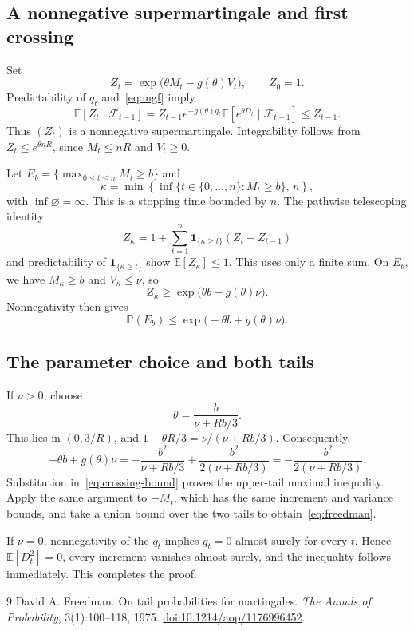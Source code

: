 \documentclass[11pt,a4paper]{article}
\numberwithin{equation}{section}
\theoremstyle{remark}
\newcommand{\E}{\mathbb E}
\newcommand{\Pp}{\mathbb P}
\newcommand{\F}{\mathcal F}
\newcommand{\ind}{\mathbf 1}
\begin{document}
\subsection{A nonnegative supermartingale and first crossing}

Set
\[
 Z_t=\exp\!\bigl(\theta M_t-g(\theta)V_t\bigr),\qquad Z_0=1.
\]
Predictability of $q_t$ and~\eqref{eq:mgf} imply
\[
 \E[Z_t\mid\F_{t-1}]
 =Z_{t-1}e^{-g(\theta)q_t}
       \E[e^{\theta D_t}\mid\F_{t-1}]
 \le Z_{t-1}.
\]
Thus $(Z_t)$ is a nonnegative supermartingale. Integrability follows
from $Z_t\le e^{\theta nR}$, since $M_t\le nR$ and $V_t\ge0$.

Let $E_b=\{\max_{0\le t\le n}M_t\ge b\}$ and
\[
 \kappa=\min\!\left\{\inf\{t\in\{0,\ldots,n\}:M_t\ge b\},\,n\right\},
\]
with $\inf\varnothing=\infty$. This is a stopping time bounded by $n$.
The pathwise telescoping identity
\[
 Z_\kappa=1+\sum_{t=1}^n
       \ind_{\{\kappa\ge t\}}(Z_t-Z_{t-1})
\]
and predictability of $\ind_{\{\kappa\ge t\}}$ show
$\E[Z_\kappa]\le1$. This uses only a finite sum.
On $E_b$, we have $M_\kappa\ge b$ and $V_\kappa\le\nu$, so
\[
 Z_\kappa\ge\exp\!\bigl(\theta b-g(\theta)\nu\bigr).
\]
Nonnegativity then gives
\begin{equation}\label{eq:crossing-bound}
 \Pp(E_b)\le\exp\!\bigl(-\theta b+g(\theta)\nu\bigr).
\end{equation}

\subsection{The parameter choice and both tails}

If $\nu>0$, choose
\[
 \theta=\frac{b}{\nu+Rb/3}.
\]
This lies in $(0,3/R)$, and
$1-\theta R/3=\nu/(\nu+Rb/3)$. Consequently,
\[
 -\theta b+g(\theta)\nu
 =-\frac{b^2}{\nu+Rb/3}
   +\frac{b^2}{2(\nu+Rb/3)}
 =-\frac{b^2}{2(\nu+Rb/3)}.
\]
Substitution in~\eqref{eq:crossing-bound} proves the upper-tail
maximal inequality. Apply the same argument to $-M_t$, which has the
same increment and variance bounds, and take a union bound over the
two tails to obtain~\eqref{eq:freedman}.

If $\nu=0$, nonnegativity of the $q_t$ implies $q_t=0$ almost surely
for every $t$. Hence $\E[D_t^2]=0$, every increment vanishes almost
surely, and the inequality follows immediately. This completes the proof.

\begin{thebibliography}{9}
David A. Freedman.
\newblock On tail probabilities for martingales.
\newblock \emph{The Annals of Probability}, 3(1):100--118, 1975.
\newblock \href{https://doi.org/10.1214/aop/1176996452}{doi:10.1214/aop/1176996452}.
\end{thebibliography}
\end{document}
